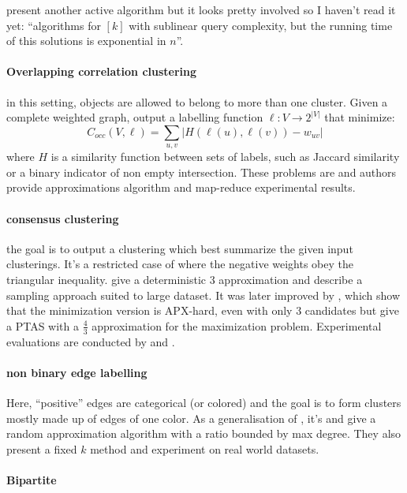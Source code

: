 \autocite[Section 5]{Ailon2014} present another active algorithm but it looks
pretty involved so I haven't read it yet: \enquote{algorithms for \mind$[k]$
with sublinear query complexity, but the running time of this solutions is
exponential in $n$}.

\paragraph{Overlapping correlation clustering \autocite{Bonchi2012}} in this setting,
objects are allowed to belong to more than one cluster. Given a complete
weighted graph, output a labelling function $\ell: V \rightarrow 2^{|V|}$ that
minimize: \[C_{occ}(V, \ell) = \sum_{u,v} \left| H(\ell(u), \ell(v)) -
		w_{uv}\right|\] where $H$ is a similarity function between sets of
labels, such as Jaccard similarity or a binary indicator of non empty
intersection. These problems are \nph{} and authors provide approximations
algorithm and map-reduce experimental results.

\paragraph{consensus clustering} 
the goal is to output a clustering which best summarize the given input
clusterings.  It's a restricted case of \pcc{} where the negative weights obey
the triangular inequality.  \Textcite{Gionis2007} give a deterministic 3
approximation and describe a sampling approach suited to large dataset. It was
later improved by \textcite{Bonizzoni2008}, which show that the minimization
version is APX-hard, even with only 3 candidates but give a PTAS with a
$\frac{4}{3}$ approximation for the maximization problem. Experimental
evaluations are conducted by \textcite{Bertolacci07} and \textcite{Filkov08}.

\paragraph{non binary edge labelling}
Here, \enquote{positive} edges are categorical (or colored) and the goal is to
form clusters mostly made up of edges of one color. As a generalisation of
\pcc{}, it's \nph{} and \textcite{Bonchi2012a} give a random approximation
algorithm with a ratio bounded by max degree. They also present a fixed $k$
method and experiment on real world datasets.

\paragraph{Bipartite \pcc{} \autocite{Bipartite12}}

